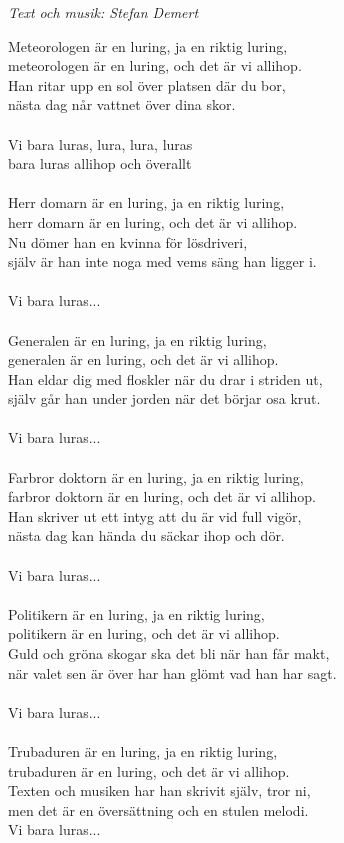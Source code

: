 {\footnotesize\textit{Text och musik: Stefan Demert}}\par
\vspace{10pt}
Meteorologen är en luring, ja en riktig luring,\\
meteorologen är en luring, och det är vi allihop.\\
Han ritar upp en sol över platsen där du bor,\\
nästa dag når vattnet över dina skor.\\
\\
Vi bara luras, lura, lura, luras\\
bara luras allihop och överallt\\
\\
Herr domarn är en luring, ja en riktig luring,\\
herr domarn är en luring, och det är vi allihop.\\
Nu dömer han en kvinna för lösdriveri,\\
själv är han inte noga med vems säng han ligger i.\\
\\
Vi bara luras...\\
\\
Generalen är en luring, ja en riktig luring,\\
generalen är en luring, och det är vi allihop.\\
Han eldar dig med floskler när du drar i striden ut,\\
själv går han under jorden när det börjar osa krut.\\
\\
Vi bara luras...\\
\\
Farbror doktorn är en luring, ja en riktig luring,\\
farbror doktorn är en luring, och det är vi allihop.\\
Han skriver ut ett intyg att du är vid full vigör,\\
nästa dag kan hända du säckar ihop och dör.\\
\\
Vi bara luras...\\
\\
Politikern är en luring, ja en riktig luring,\\
politikern är en luring, och det är vi allihop.\\
Guld och gröna skogar ska det bli när han får makt,\\
när valet sen är över har han glömt vad han har sagt.\\
\\
Vi bara luras...\\
\\
Trubaduren är en luring, ja en riktig luring,\\
trubaduren är en luring, och det är vi allihop.\\
Texten och musiken har han skrivit själv, tror ni,\\
men det är en översättning och en stulen melodi.\\
Vi bara luras...
